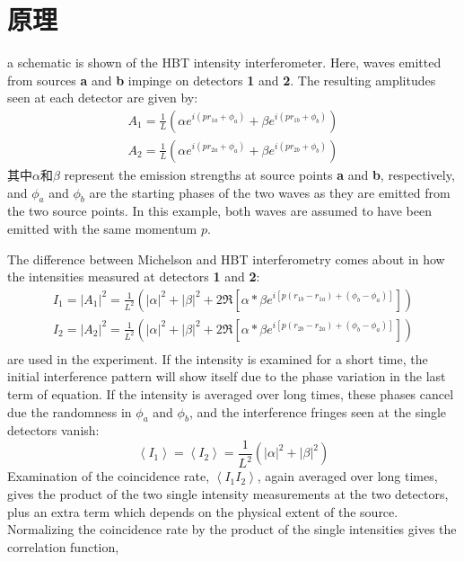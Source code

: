 \section{原理}
a schematic is shown of the HBT intensity interferometer.%
Here, waves emitted from sources \textbf{a} and \textbf{b} impinge on detectors \textbf{1} and \textbf{2}.%
The resulting amplitudes seen at each detector are given by:%
\begin{gather}
  A_{1} = \frac{1}{L}(\alpha e^{i(pr_{1a}+\phi_{a})} + \beta e^{i(pr_{1b}+\phi_{b})}) \\
  A_{2} = \frac{1}{L}(\alpha e^{i(pr_{2a}+\phi_{a})} + \beta e^{i(pr_{2b}+\phi_{b})})
\end{gather}
其中$\alpha$和$\beta$ represent the emission strengths at source points \textbf{a} and \textbf{b},%
respectively, and $\phi_{a}$ and $\phi_{b}$ are the starting phases of the two waves as they are emitted from the two source points.%
In this example, both waves are assumed to have been emitted with the same momentum $p$.
\par
The difference between Michelson and HBT interferometry comes about in how the intensities measured at detectors \textbf{1} and \textbf{2}:
\begin{gather}
  I_{1} = |{A_{1}}|^{2} = \frac{1}{L^{2}}(|\alpha |^{2} + |\beta |^{2} + 2\Re[\alpha * \beta e^{i[p(r_{1b}-r_{1a})+(\phi_{b}-\phi_{a})]}]) \\
  I_{2} = |{A_{2}}|^{2} = \frac{1}{L^{2}}(|\alpha |^{2} + |\beta |^{2} + 2\Re[\alpha * \beta e^{i[p(r_{2b}-r_{2a})+(\phi_{b}-\phi_{a})]}]) \\
\end{gather}
are used in the experiment.%
If the intensity is examined for a short time,%
the initial interference pattern will show itself due to the phase variation in the last term of equation.%
If the intensity is averaged over long times,%
these phases cancel due the randomness in $\phi_{a}$ and $\phi_{b}$,%
and the interference fringes seen at the single detectors vanish:
\begin{equation}
  \label{eq:chapterSix10}
  \left<I_{1}\right> = \left<I_{2}\right> = \frac{1}{L^{2}}(|\alpha|^{2} + |\beta|^{2})
\end{equation}
Examination of the coincidence rate, $\left<I_{1}I_{2}\right>$, again averaged over long times,%
gives the product of the two single intensity measurements at the two detectors,%
plus an extra term which depends on the physical extent of the source.%
Normalizing the coincidence rate by the product of the single intensities gives the correlation function,%
